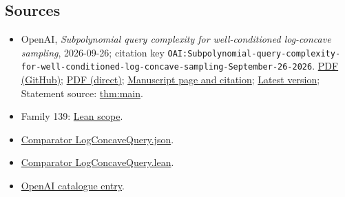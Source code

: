 \documentclass[11pt]{article}
\begin{document}
\subsection{Sources}
\begin{itemize}
\item OpenAI, \emph{Subpolynomial query complexity for well-conditioned log-concave sampling}, 2026-09-26; citation key \texttt{OAI:Subpolynomial-query-complexity-for-well-conditioned-log-concave-sampling-September-26-2026}. \href{https://github.com/openai/math/blob/adc7f1241b42e322a6451854ab7e4b4c146bf78a/preprints/Subpolynomial-query-complexity-for-well-conditioned-log-concave-sampling-September-26-2026/article.pdf}{PDF (GitHub)}; \href{https://github.com/openai/math/raw/adc7f1241b42e322a6451854ab7e4b4c146bf78a/preprints/Subpolynomial-query-complexity-for-well-conditioned-log-concave-sampling-September-26-2026/article.pdf}{PDF (direct)}; \href{https://github.com/openai/math/blob/adc7f1241b42e322a6451854ab7e4b4c146bf78a/preprints/Subpolynomial-query-complexity-for-well-conditioned-log-concave-sampling-September-26-2026/README.md}{Manuscript page and citation}; \href{https://github.com/openai/math/blob/main/preprints/Subpolynomial-query-complexity-for-well-conditioned-log-concave-sampling-September-26-2026/article.pdf}{Latest version}; Statement source: \href{https://github.com/openai/math/blob/adc7f1241b42e322a6451854ab7e4b4c146bf78a/preprints/Subpolynomial-query-complexity-for-well-conditioned-log-concave-sampling-September-26-2026/build/sections/introduction.tex\#L51}{thm:main}.
\item Family 139: \href{https://github.com/openai/math/blob/adc7f1241b42e322a6451854ab7e4b4c146bf78a/lean/docs/139.md}{Lean scope}.
\item \href{https://github.com/openai/math/blob/adc7f1241b42e322a6451854ab7e4b4c146bf78a/lean/ComparatorChallenges/LogConcaveQuery.json}{Comparator LogConcaveQuery.json}.
\item \href{https://github.com/openai/math/blob/adc7f1241b42e322a6451854ab7e4b4c146bf78a/lean/ComparatorChallenges/LogConcaveQuery.lean}{Comparator LogConcaveQuery.lean}.
\item \href{https://github.com/openai/math/blob/adc7f1241b42e322a6451854ab7e4b4c146bf78a/CONTENTS.md}{OpenAI catalogue entry}.
\end{itemize}
\end{document}
